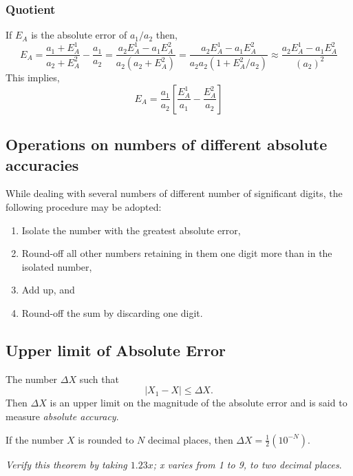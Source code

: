 \documentclass[aima203_lecturenotes_ku.tex]{subfiles}
\begin{document}
\subsubsection{Quotient}
If \(E_A\) is the absolute error of \(a_1/ a_2\) then,
\begin{equation*}
  E_A = \frac{a_1 + E_A^1}{a_2 +E_A^2} -\frac{a_1}{a_2} = \frac{a_2E_A^1-a_1E_A^2}{a_2(a_2 +E_A^2)} = \frac{a_2E_A^1-a_1E_A^2}{a_2a_2(1 +E_A^2/a_2)} \approx \frac{a_2E_A^1-a_1E_A^2}{(a_2)^2}
\end{equation*}
This implies,
\begin{equation}
  \label{eq:6}
  E_A = \frac{a_1}{a_2} \left[ \frac{E_A^1}{a_1} -\frac{E_A^2}{a_2} \right ]
\end{equation}

\subsection{Operations on numbers of different absolute accuracies}
While dealing with several numbers of different number of significant digits, the following procedure may be adopted:

\begin{enumerate}
\item Isolate the number with the greatest absolute error,
\item Round-off all other numbers retaining in them one digit more than in the isolated number,
\item Add up, and
\item Round-off the sum by discarding one digit.
\end{enumerate}

\subsection{Upper limit of Absolute Error}
The number \(\Delta X\) such that
\begin{equation}
  \label{eq:7}
  \left | X_1 -X \right | \leq \Delta X .
\end{equation}
Then \(\Delta X\) is an upper limit on the magnitude of the absolute error and is said to measure \textit{absolute accuracy}.

\begin{theorem}
  If the number \(X\) is rounded to \(N\) decimal places, then \(\displaystyle \Delta X = \frac{1}{2} (10^{-N})\).
\end{theorem}
\textit{Verify this theorem by taking $1.23x$; x varies from 1 to 9, to two decimal places}.
\end{document}
